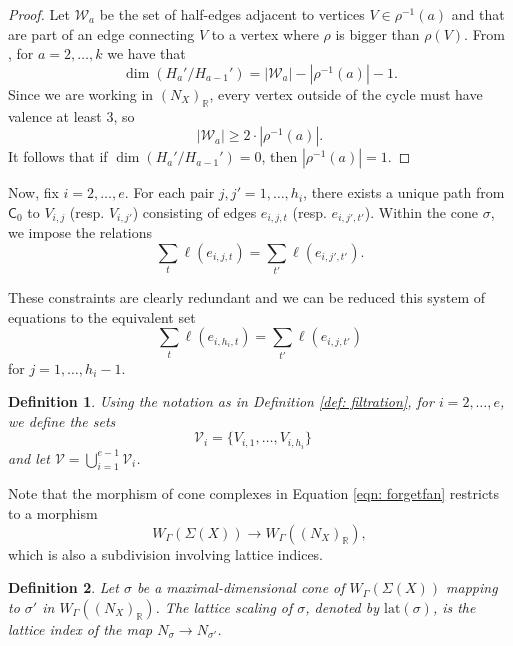 \documentclass{article}
\def\cV{\mathcal{V}}
\newtheorem{definition}{Definition}[section]
\newcommand{\tropC}{\mathsf{C}}
\begin{document}
    \begin{proof}
        Let $\mathcal{W}_a$ be the set of half-edges adjacent to vertices $V \in \rho^{-1}(a)$ and that are part of an edge connecting $V$ to a vertex where $\rho$ is bigger than $\rho(V)$. 
        From \cite[Proposition 3.2.18(c)]{Tor14}, for $a = 2, \ldots, k$ we have that $$\dim(H_a'/H_{a-1}') = |\mathcal{W}_a| - | \rho^{-1}(a)| - 1.$$
        Since we are working in $(N_X)_{\mathbb{R}}$, every vertex outside of the cycle must have valence at least $3$, so 
        $$ |\mathcal{W}_a| \geq 2 \cdot | \rho^{-1}(a)|.$$
        It follows that if $\dim(H_a'/H_{a-1}') = 0$, then $| \rho^{-1}(a)| = 1$. 
    \end{proof}

    
    Now, fix $i=2,\ldots,e$. For each pair $j,j'=1,\ldots, h_i$, there exists a unique path from $\tropC_0$ to $V_{i,j}$ (resp. $V_{i,j'}$) consisting of edges $e_{i,j,t}$ (resp. $e_{i,j',t'}$). Within the cone $\sigma$, we impose the relations
\begin{equation*} \label{eqn: well-spaced relations}
    \sum_{t} \ell(e_{i,j,t}) = \sum_{t'} \ell(e_{i,j',t'}).
\end{equation*}

These constraints are clearly redundant and we can be reduced this system of equations to the equivalent set
\begin{equation*} 
    \sum_{t} \ell(e_{i,h_i,t}) = \sum_{t'} \ell(e_{i,j,t'})
\end{equation*}
for $j = 1, \ldots, h_i-1$.
    
    \begin{definition}\label{def: sets V}
        Using the notation as in Definition \ref{def: filtration}, for $i = 2, \ldots, e$, we define the sets
    \begin{equation}\label{def: cV}
    \mathcal{V}_i = \{V_{i,1}, \ldots, V_{i,h_i}\} \quad 
    \end{equation}
    and let $\cV= \bigcup_{i=1}^{e-1} \mathcal{V}_i$.
    \end{definition}
    
    Note that the morphism of cone complexes in Equation \eqref{eqn: forgetfan} restricts to a morphism
\begin{equation} \label{eqn:ws-forgetfan}
    W_\Gamma(\Sigma(X)) \rightarrow W_\Gamma((N_X)_{\mathbb{R}}),
\end{equation}
which is also a subdivision involving lattice indices.

    \begin{definition} \label{def: lattice index}
    Let $\sigma$ be a maximal-dimensional cone of $W_{\Gamma}(\Sigma(X))$ mapping to $\sigma'$ in $W_{\Gamma}((N_X)_{\mathbb{R}})$. The \emph{lattice scaling} of $\sigma$, denoted by $\mathrm{lat}(\sigma)$, is the lattice index of the map $N_\sigma \rightarrow N_{\sigma'}$.
\end{definition}
\end{document}
